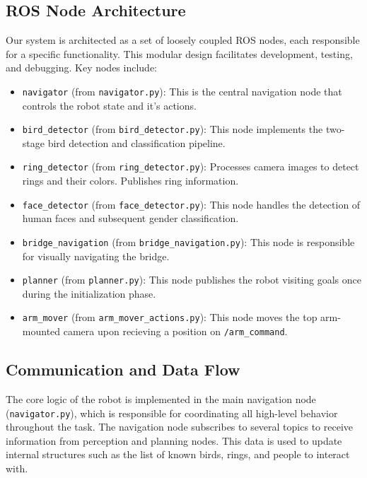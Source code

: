 \documentclass[a4paper]{article}
\begin{document}
\subsection{ROS Node Architecture}
Our system is architected as a set of loosely coupled ROS nodes, each responsible for a specific functionality. This modular design facilitates development, testing, and debugging. Key nodes include:
\begin{itemize}
    \item \texttt{navigator} (from \texttt{navigator.py}): This is the central navigation node that controls the robot state and it's actions.
    
    \item \texttt{bird\_detector} (from \texttt{bird\_detector.py}): This node implements the two-stage bird detection and classification pipeline.
        
    \item \texttt{ring\_detector} (from \texttt{ring\_detector.py}): Processes camera images to detect rings and their colors. Publishes ring information.
    \item \texttt{face\_detector} (from \texttt{face\_detector.py}): This node handles the detection of human faces and subsequent gender classification.

    \item \texttt{bridge\_navigation} (from \texttt{bridge\_navigation.py}): This node is responsible for visually navigating the bridge.

    \item \texttt{planner} (from \texttt{planner.py}): This node publishes the robot visiting goals once during the initialization phase.

    \item \texttt{arm\_mover} (from \texttt{arm\_mover\_actions.py}): This node moves the top arm-mounted camera upon recieving a position on \texttt{/arm\_command}.
    
\end{itemize}


\newpage
\subsection{Communication and Data Flow}

The core logic of the robot is implemented in the main navigation node (\texttt{navigator.py}), which is responsible for coordinating all high-level behavior throughout the task. The navigation node subscribes to several topics to receive information from perception and planning nodes. This data is used to update internal structures such as the list of known birds, rings, and people to interact with.
\end{document}
